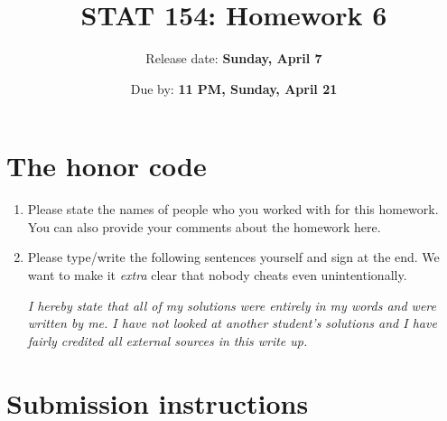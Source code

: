 \documentclass[11pt]{article}\usepackage[]{graphicx}\usepackage[]{color}
\title{STAT 154: Homework 6}
\author{Release date: \textbf{Sunday, April 7}}
\date{Due by: \textbf{11 PM, Sunday, April 21}}
\begin{document}
\maketitle

\section*{The honor code}

\begin{enumerate}[label=(\alph*)]
\item Please state the names of people who you worked with for this homework.
You can also provide your comments about the homework here.
\begin{tcolorbox}
\vspace{20mm}
\end{tcolorbox}

\item  Please type/write the following sentences yourself and sign at the end. We want to make
it \emph{extra} clear that nobody cheats even unintentionally.

\emph{I hereby state that all of my solutions were entirely in my words and were written by me.
I have not looked at another student’s solutions and I have fairly credited all external 
sources in this write up.}
\begin{tcolorbox}
\vspace{20mm}
\end{tcolorbox}

\end{enumerate}

\section*{Submission instructions}
\end{document}
